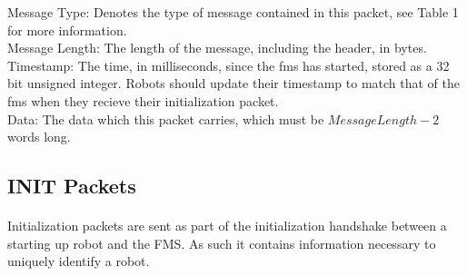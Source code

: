 \documentclass[11pt]{article}
\begin{document}
Message Type: Denotes the type of message contained in this packet, see Table 1 for more information.\\
Message Length: The length of the message, including the header, in bytes.
Timestamp: The time, in milliseconds, since the \acrshort{fms} has started, stored as a 32 bit unsigned integer.
Robots should update their timestamp to match that of the \acrshort{fms} when they recieve their initialization packet.\\
Data: The data which this packet carries, which must be $Message Length - 2$ words long.\\

\subsection {INIT Packets}
\paragraph{}
Initialization packets are sent as part of the initialization handshake between a starting up robot and the FMS.  
As such it contains information necessary to uniquely identify a robot.  
\newline
\end{document}
